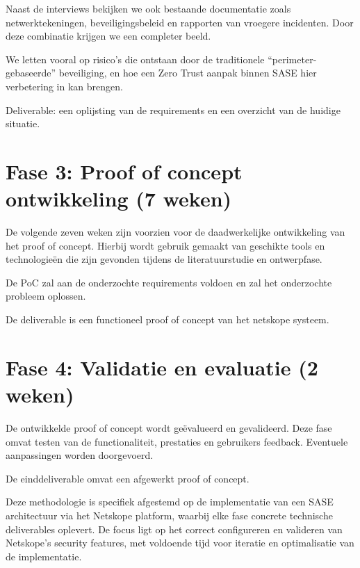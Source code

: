 \vspace{2ex}

Naast de interviews bekijken we ook bestaande documentatie zoals netwerktekeningen, beveiligingsbeleid en rapporten van vroegere incidenten. Door deze combinatie krijgen we een completer beeld. 

\vspace{2ex}

We letten vooral op risico’s die ontstaan door de traditionele “perimeter-gebaseerde” beveiliging, en hoe een Zero Trust aanpak binnen SASE hier verbetering in kan brengen. 

\vspace{2ex}

Deliverable: een oplijsting van de requirements en een overzicht van de huidige situatie.

\section{Fase 3: Proof of concept ontwikkeling (7 weken)}
De volgende zeven weken zijn voorzien voor de daadwerkelijke ontwikkeling van het
proof of concept. Hierbij wordt gebruik gemaakt van geschikte tools en technologieën die zijn gevonden tijdens de literatuurstudie en ontwerpfase.

\vspace{2ex}

De PoC zal aan de onderzochte requirements voldoen en zal het onderzochte probleem oplossen. 

\vspace{2ex}

De deliverable is een functioneel proof of concept van het netskope systeem.

\section{Fase 4: Validatie en evaluatie (2 weken)}
De ontwikkelde proof of concept wordt geëvalueerd en gevalideerd. Deze fase omvat testen van de functionaliteit, prestaties en
gebruikers feedback. Eventuele aanpassingen worden doorgevoerd. 

\vspace{2ex}

De einddeliverable omvat een afgewerkt proof of concept.

\vspace{2ex}

Deze methodologie is specifiek afgestemd op de implementatie van een SASE architectuur via het Netskope platform, waarbij elke fase concrete technische deliverables oplevert. De focus ligt op het correct configureren en valideren van Netskope's security features, met voldoende tijd voor iteratie en optimalisatie van de implementatie.

